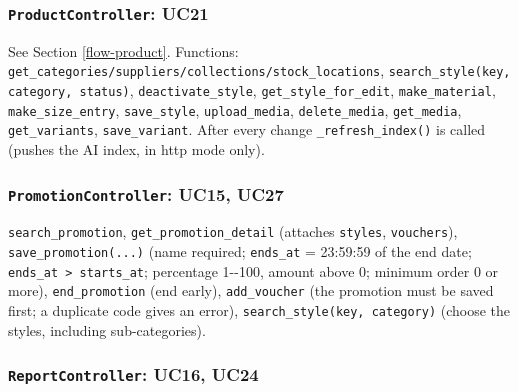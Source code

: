 \hypertarget{productcontroller-uc21}{%
\subsubsection{\texorpdfstring{\texttt{ProductController}:
UC21}{ProductController: UC21}}\label{productcontroller-uc21}}

See Section \ref{flow-product}. Functions:
\texttt{get\_\allowbreak{}categories/\allowbreak{}suppliers/\allowbreak{}collections/\allowbreak{}stock\_\allowbreak{}locations},
\texttt{search\_\allowbreak{}style(\allowbreak{}key,\allowbreak{} category,\allowbreak{} status)},
\texttt{deactivate\_\allowbreak{}style}, \texttt{get\_\allowbreak{}style\_\allowbreak{}for\_\allowbreak{}edit},
\texttt{make\_\allowbreak{}material}, \texttt{make\_\allowbreak{}size\_\allowbreak{}entry},
\texttt{save\_\allowbreak{}style}, \texttt{upload\_\allowbreak{}media}, \texttt{delete\_\allowbreak{}media},
\texttt{get\_\allowbreak{}media}, \texttt{get\_\allowbreak{}variants}, \texttt{save\_\allowbreak{}variant}.
After every change \texttt{\_\allowbreak{}refresh\_\allowbreak{}index(\allowbreak{})} is called (pushes the AI
index, in http mode only).

\hypertarget{promotioncontroller-uc15-uc27}{%
\subsubsection{\texorpdfstring{\texttt{PromotionController}: UC15,
UC27}{PromotionController: UC15, UC27}}\label{promotioncontroller-uc15-uc27}}

\texttt{search\_\allowbreak{}promotion}, \texttt{get\_\allowbreak{}promotion\_\allowbreak{}detail} (attaches
\texttt{styles}, \texttt{vouchers}), \texttt{save\_\allowbreak{}promotion(\allowbreak{}.\allowbreak{}.\allowbreak{}.\allowbreak{})} (name
required; \texttt{ends\_\allowbreak{}at} = 23:59:59 of the end date;
\texttt{ends\_\allowbreak{}at \textgreater{}\allowbreak{} starts\_\allowbreak{}at}; percentage 1-\/-100,
amount above 0; minimum order 0 or more), \texttt{end\_\allowbreak{}promotion} (end
early), \texttt{add\_\allowbreak{}voucher} (the promotion must be saved first; a
duplicate code gives an error), \texttt{search\_\allowbreak{}style(\allowbreak{}key,\allowbreak{} category)}
(choose the styles, including sub-categories).

\hypertarget{reportcontroller-uc16-uc24}{%
\subsubsection{\texorpdfstring{\texttt{ReportController}: UC16,
UC24}{ReportController: UC16, UC24}}\label{reportcontroller-uc16-uc24}}

